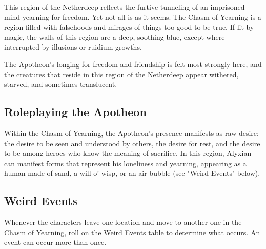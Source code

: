\documentclass[a4paper, 11pt, bg=full, twocolumn, nooutline]{dndbook}
\begin{document}
This region of the Netherdeep reflects the furtive tunneling of an imprisoned mind yearning for freedom. Yet not all is as it seems. The Chasm of Yearning is a region filled with falsehoods and mirages of things too good to be true. If lit by magic, the walls of this region are a deep, soothing blue, except where interrupted by illusions or ruidium growths.

The Apotheon's longing for freedom and friendship is felt most strongly here, and the creatures that reside in this region of the Netherdeep appear withered, starved, and sometimes translucent.

\subsection{Roleplaying the Apotheon}

Within the Chasm of Yearning, the Apotheon's presence manifests as raw desire: the desire to be seen and understood by others, the desire for rest, and the desire to be among heroes who know the meaning of sacrifice. In this region, Alyxian can manifest forms that represent his loneliness and yearning, appearing as a human made of sand, a will-o'-wisp, or an air bubble (see "Weird Events" below).

\subsection{Weird Events}

Whenever the characters leave one location and move to another one in the Chasm of Yearning, roll on the Weird Events table to determine what occurs. An event can occur more than once.
\end{document}
